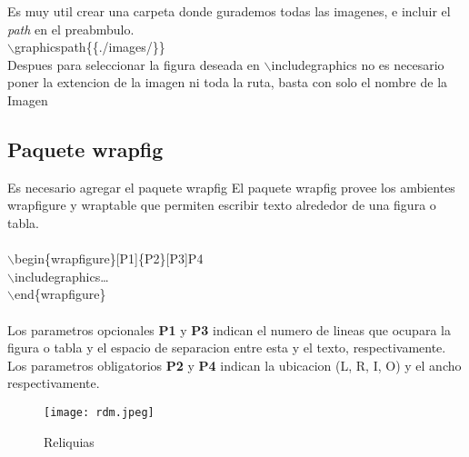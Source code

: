 \documentclass{article}
\begin{document}
	Es muy util crear una carpeta donde gurademos todas las imagenes, e incluir el \textit{path} en el preabmbulo.\\\textcolor{myOrange}{$\backslash$graphicspath}\{\{./images/\}\}\\ Despues para seleccionar la figura deseada en \textcolor{myGreen}{$\backslash$includegraphics} no es necesario poner la extencion de la imagen ni toda la ruta, basta con solo el nombre de la Imagen

	\subsection{Paquete wrapfig}
	Es necesario agregar el paquete wrapfig
	El paquete \textcolor{myGreen}{wrapfig} provee los ambientes \textcolor{myGreen}{wrapfigure} y \textcolor{myGreen}{wraptable} que permiten escribir texto alrededor de una figura o tabla.
	\\\\\textcolor{myGreen}{$\backslash$begin}\{wrapfigure\}[P1]\{P2\}[P3]{P4}\\\textcolor{myGreen}{$\backslash$includegraphics}\dots\\\textcolor{myGreen}{$\backslash$end}\{wrapfigure\}\\\\
	Los parametros opcionales \textbf{P1} y \textbf{P3} indican el numero de lineas que ocupara la figura o tabla y el espacio de separacion entre esta y el texto, respectivamente.\\Los parametros obligatorios \textbf{P2} y \textbf{P4} indican la ubicacion (L, R, I, O) y el ancho respectivamente.
	\begin{wrapfigure}[13]{l}[5mm]{0.35\textwidth}
	\centering
	\texttt{[image: rdm.jpeg]}
	\caption{Reliquias}
	\end{wrapfigure}
	\lipsum[1-2] 
\end{document}
